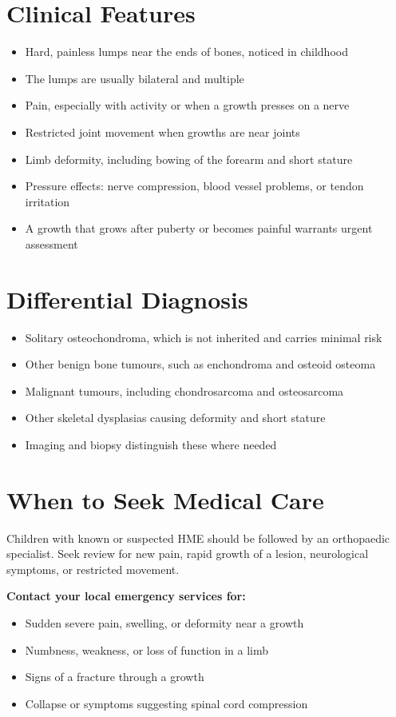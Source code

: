 \section*{Clinical Features}
\begin{itemize}
    \item Hard, painless lumps near the ends of bones, noticed in childhood
    \item The lumps are usually bilateral and multiple
    \item Pain, especially with activity or when a growth presses on a nerve
    \item Restricted joint movement when growths are near joints
    \item Limb deformity, including bowing of the forearm and short stature
    \item Pressure effects: nerve compression, blood vessel problems, or tendon irritation
    \item A growth that grows after puberty or becomes painful warrants urgent assessment
\end{itemize}

\section*{Differential Diagnosis}
\begin{itemize}
    \item Solitary osteochondroma, which is not inherited and carries minimal risk
    \item Other benign bone tumours, such as enchondroma and osteoid osteoma
    \item Malignant tumours, including chondrosarcoma and osteosarcoma
    \item Other skeletal dysplasias causing deformity and short stature
    \item Imaging and biopsy distinguish these where needed
\end{itemize}

\section*{When to Seek Medical Care}
Children with known or suspected HME should be followed by an orthopaedic specialist. Seek review for new pain, rapid growth of a lesion, neurological symptoms, or restricted movement.

\textbf{Contact your local emergency services for:}
\begin{itemize}
    \item Sudden severe pain, swelling, or deformity near a growth
    \item Numbness, weakness, or loss of function in a limb
    \item Signs of a fracture through a growth
    \item Collapse or symptoms suggesting spinal cord compression
\end{itemize}

